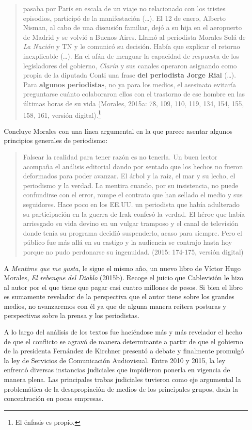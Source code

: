 \begin{quote}
pasaba por París en escala de un viaje no relacionado con los tristes episodios, participó de la manifestación (\ldots). El 12 de enero, Alberto Nisman, al cabo de una discusión familiar, dejó a su hija en el aeropuerto de Madrid y se volvió a Buenos Aires. Llamó al periodista Morales Solá de \emph{La Nación} y TN y le comunicó su decisión. Había que explicar el retorno inexplicable (\ldots). En el afán de menguar la capacidad de respuesta de los legisladores del gobierno, \emph{Clarín} y sus canales operaron asignando como propia de la diputada Conti una frase \textbf{del periodista Jorge Rial} (\ldots). Para \textbf{algunos periodistas}, no ya para los medios, el asesinato evitaría preguntarse cuánto colaboraron ellos con el trastorno de ese hombre en las últimas horas de su vida (Morales, 2015a: 78, 109, 110, 119, 134, 154, 155, 158, 161, versión digital).\footnote{El énfasis es propio.}
\end{quote}

Concluye Morales con una línea argumental en la que parece asentar algunos principios generales de periodismo:

\begin{quote}
Falsear la realidad para tener razón es no tenerla. Un buen lector acompaña el análisis editorial dando por sentado que los hechos no fueron deformados para poder avanzar. El árbol y la raíz, el mar y su lecho, el periodismo y la verdad. La mentira cuando, por su insistencia, no puede confundirse con el error, rompe el contrato que han sellado el medio y sus seguidores. Hace poco en los EE.UU. un periodista que había adulterado su participación en la guerra de Irak confesó la verdad. El héroe que había arriesgado su vida devino en un vulgar tramposo y el canal de televisión donde tenía su programa decidió suspenderlo, acaso para siempre. Pero el público fue más allá en su castigo y la audiencia se contrajo hasta hoy porque no pudo perdonarse su ingenuidad. (2015: 174-175, versión digital)
\end{quote}

A \emph{Mentime que me gusta}, le sigue el mismo año, un nuevo libro de Víctor Hugo Morales, \emph{El rebenque del Diablo} (2015b). Recoge el juicio que Cablevisión le hizo al autor por el que tiene que pagar casi cuatro millones de pesos. Si bien el libro es sumamente revelador de la perspectiva que el autor tiene sobre los grandes medios, no avanzaremos con él ya que de alguna manera reitera posturas y perspectivas sobre la prensa y los periodistas.

A lo largo del análisis de los textos fue haciéndose más y más revelador el hecho de que el conflicto se agravó de manera determinante a partir de que el gobierno de la presidenta Fernández de Kirchner presentó a debate y finalmente promulgó la ley de Servicios de Comunicación Audiovisual. Entre 2010 y 2015, la ley enfrentó diversas instancias judiciales que impidieron ponerla en vigencia de manera plena. Las principales trabas judiciales tuvieron como eje argumental la problemática de la desapropiación de medios de los principales grupos, dada la concentración en pocas empresas.

